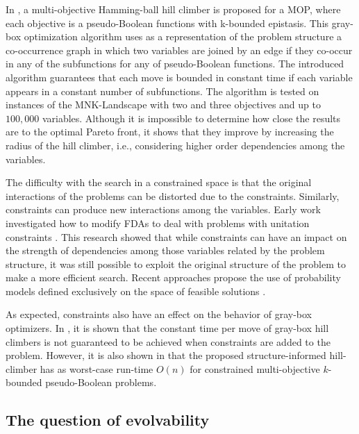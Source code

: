 \documentclass{article} %
\begin{document}
 In \cite{Chicano_et_al:2016a}, a multi-objective Hamming-ball hill climber is proposed for a MOP, where each objective is a  pseudo-Boolean functions with k-bounded epistasis. This gray-box optimization algorithm uses as a representation of the problem structure  a co-occurrence graph in which two variables are joined by an edge if they co-occur in any of the subfunctions for any of pseudo-Boolean functions. The introduced algorithm guarantees that  each move is bounded in constant time if each variable appears in a constant  number of subfunctions. The algorithm is tested on instances of the MNK-Landscape with two and three objectives and up to $100,000$ variables. Although it is impossible to determine how close the results are to the optimal Pareto front, it shows that they improve by increasing the radius of the hill climber, i.e., considering higher order dependencies among the variables.

  The difficulty with the search in a constrained space is that the original interactions of the problems can be distorted due to the constraints. Similarly, constraints can produce new interactions among the variables. Early work investigated how to modify FDAs to deal with problems with unitation constraints \cite{Santana_and_Ochoa:1999b,Santana_et_al:2001c}. This research showed that while constraints can have an impact on  the strength of dependencies among those variables related by the problem structure, it was still possible to exploit the original structure of the problem to make a more efficient search. Recent approaches propose the use of probability models defined exclusively on the space of feasible solutions \cite{Ceberio_et_al:2017}.
 
 As expected, constraints also have an effect on the behavior of gray-box optimizers. In \cite{Chicano_et_al:2016}, it is shown that the constant time per move of gray-box hill climbers is not guaranteed to be achieved when constraints are added to the problem. However, it is also shown in \cite{Chicano_et_al:2016} that the proposed structure-informed hill-climber has as worst-case run-time $O(n)$ for constrained multi-objective $k$-bounded pseudo-Boolean problems.
 

\subsection{The question of evolvability}
\end{document}
